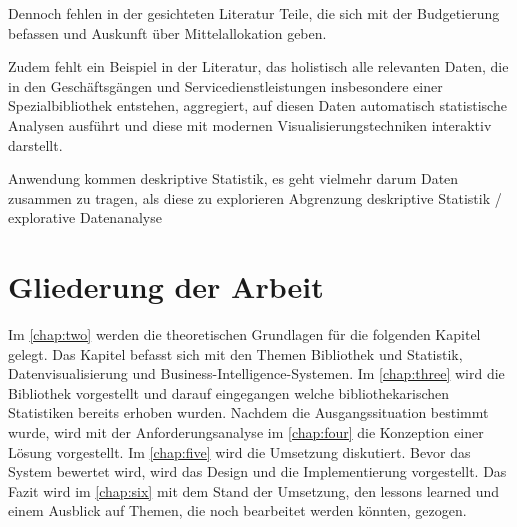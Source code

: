 Dennoch fehlen in der gesichteten Literatur Teile, die sich mit der Budgetierung
befassen und Auskunft über Mittelallokation geben.

Zudem fehlt ein Beispiel in der Literatur, das holistisch alle relevanten Daten, die in den
Geschäftsgängen und Servicedienstleistungen insbesondere einer Spezialbibliothek entstehen,
aggregiert, auf diesen Daten automatisch statistische Analysen ausführt und diese mit modernen Visualisierungstechniken
interaktiv darstellt.

Anwendung kommen deskriptive Statistik, es geht vielmehr darum Daten zusammen zu tragen, als diese zu explorieren 
Abgrenzung deskriptive Statistik / explorative Datenanalyse

\section{Gliederung der Arbeit}
Im \autoref{chap:two} werden die theoretischen Grundlagen für die folgenden Kapitel gelegt. Das Kapitel befasst
sich mit den Themen Bibliothek und Statistik, Datenvisualisierung und Business-Intelligence-Systemen. Im \autoref{chap:three}
wird die Bibliothek vorgestellt und darauf eingegangen welche bibliothekarischen Statistiken bereits erhoben wurden.
Nachdem die Ausgangssituation bestimmt wurde, wird mit der Anforderungsanalyse im \autoref{chap:four} die Konzeption einer Lösung vorgestellt.
Im \autoref{chap:five} wird die Umsetzung diskutiert. Bevor das System bewertet wird, wird das Design und die Implementierung vorgestellt.
Das Fazit wird im \autoref{chap:six} mit dem Stand der Umsetzung, den lessons learned und einem Ausblick auf Themen, die noch bearbeitet werden könnten, gezogen.
